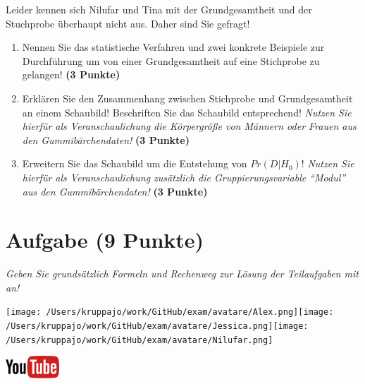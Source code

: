 \documentclass[a4paper, 9pt]{scrartcl}\usepackage[]{graphicx}\usepackage[]{xcolor}
\begin{document}
\vspace{1ex}

Leider kennen sich Nilufar und Tina mit der Grundgesamtheit und der Stuchprobe überhaupt nicht aus. Daher sind Sie gefragt!

\begin{enumerate}
\item Nennen Sie das statistische Verfahren und zwei konkrete Beispiele zur Durchführung um von einer Grundgesamtheit auf eine Stichprobe zu gelangen! \textbf{(3 Punkte)}
\item Erklären Sie den Zusammenhang zwischen Stichprobe und Grundgesamtheit an einem Schaubild! Beschriften Sie das Schaubild entsprechend!
  \textit{Nutzen Sie hierfür als Veranschaulichung die Körpergröße von Männern oder Frauen aus den Gummibärchendaten!}  \textbf{(3 Punkte)}
\item Erweitern Sie das Schaubild um die Entstehung von $Pr(D|H_0)$! \textit{Nutzen Sie hierfür als Veranschaulichung zusätzlich die Gruppierungsvariable "`Modul"' aus den Gummibärchendaten!}  \textbf{(3 Punkte)}
\end{enumerate} 
\clearpage

\section{Aufgabe \hfill (9 Punkte)}

\textit{Geben Sie grundsätzlich Formeln und Rechenweg zur Lösung der Teilaufgaben mit an!} \\[1Ex]
 

 
\begin{minipage}[t]{0.5\textwidth}
\texttt{[image: /Users/kruppajo/work/GitHub/exam/avatare/Alex.png]}\hspace{-4mm}\texttt{[image: /Users/kruppajo/work/GitHub/exam/avatare/Jessica.png]}\hspace{-4mm}\texttt{[image: /Users/kruppajo/work/GitHub/exam/avatare/Nilufar.png]}
\end{minipage}
\begin{minipage}[t]{0.5\textwidth}
\hfill
\href{https://youtu.be/w62HJlbN28U}{\includegraphics[width = 2cm]{img/youtube}}
\end{minipage}
\end{document}
